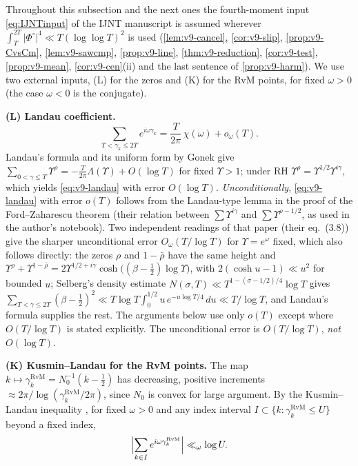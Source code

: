 \documentclass[11pt,a4paper]{article}
\numberwithin{equation}{section}
\theoremstyle{definition}
\theoremstyle{remark}
\begin{document}
Throughout this subsection and the next ones the fourth-moment input \eqref{eq:IJNTinput} of the IJNT manuscript is assumed wherever $\int_T^{2T}|\Phi^\circ|^4\ll T(\log\log T)^2$ is used (\cref{lem:v9-cancel}, \cref{cor:v9-slip}, \cref{prop:v9-CvsCm}, \cref{lem:v9-sawcmp}, \cref{prop:v9-line}, \cref{thm:v9-reduction}, \cref{cor:v9-test}, \cref{prop:v9-mean}, \cref{cor:v9-cen}(ii) and the last sentence of \cref{prop:v9-harm}). We use two external inputs, (L) for the zeros and (K) for the RvM points, for fixed $\omega>0$ (the case $\omega<0$ is the conjugate).

\medskip\noindent\textbf{(L) Landau coefficient.}
\begin{equation}\label{eq:v9-landau}
\sum_{T<\gamma_k\le2T}e^{i\omega\gamma_k}=\frac{T}{2\pi}\,\chi(\omega)+o_\omega(T).
\end{equation}
Landau's formula \cite{Landau1912} and its uniform form by Gonek \cite{Gonek1993} give $\sum_{0<\gamma\le T}\Upsilon^{\rho}=-\frac{T}{2\pi}\Lambda(\Upsilon)+O(\log T)$ for fixed $\Upsilon>1$; under RH $\Upsilon^\rho=\Upsilon^{1/2}\Upsilon^{i\gamma}$, which yields \eqref{eq:v9-landau} with error $O(\log T)$. \emph{Unconditionally}, \eqref{eq:v9-landau} with error $o(T)$ follows from the Landau-type lemma in the proof of the Ford--Zaharescu theorem \cite{FordZaharescu2005} (their relation between $\sum \Upsilon^{i\gamma}$ and $\sum \Upsilon^{\rho-1/2}$, as used in the author's notebook). Two independent readings of that paper (their eq.~(3.8)) give the sharper unconditional error $O_\omega(T/\log T)$ for $\Upsilon=e^{\omega}$ fixed, which also follows directly: the zeros $\rho$ and $1-\bar\rho$ have the same height and $\Upsilon^{\rho}+\Upsilon^{1-\bar\rho}=2\Upsilon^{1/2+i\gamma}\cosh\bigl((\beta-\tfrac12)\log\Upsilon\bigr)$, with $2(\cosh u-1)\ll u^2$ for bounded $u$; Selberg's density estimate $N(\sigma,T)\ll T^{1-(\sigma-1/2)/4}\log T$ \cite{Selberg1946} gives $\sum_{T<\gamma\le2T}(\beta-\tfrac12)^2\ll T\log T\int_0^{1/2}u\,e^{-u\log T/4}\,du\ll T/\log T$, and Landau's formula supplies the rest. The arguments below use only $o(T)$ except where $O(T/\log T)$ is stated explicitly. The unconditional error is $O(T/\log T)$, \emph{not} $O(\log T)$.

\medskip\noindent\textbf{(K) Kusmin--Landau for the RvM points.}
The map $k\mapsto\gamma_k^{\mathrm{RvM}}=N_0^{-1}(k-\frac12)$ has decreasing, positive increments $\approx2\pi/\log(\gamma_k^{\mathrm{RvM}}/2\pi)$, since $N_0$ is convex for large argument. By the Kusmin--Landau inequality \cite{GrahamKolesnik1991}, for fixed $\omega>0$ and any index interval $I\subset\{k:\gamma_k^{\mathrm{RvM}}\le U\}$ beyond a fixed index,
\begin{equation}\label{eq:v9-KL}
\Bigl|\sum_{k\in I}e^{i\omega\gamma_k^{\mathrm{RvM}}}\Bigr|\ll_\omega\log U .
\end{equation}
\end{document}
